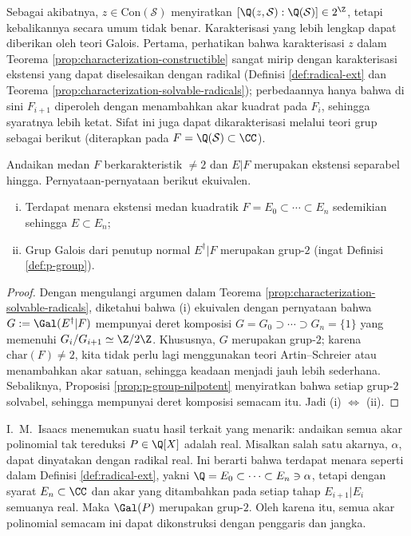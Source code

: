 Sebagai akibatnya, $z \in \text{Con}(\mathcal{S})$ menyiratkan $[\Q(z, \mathcal{S}) : \Q(\mathcal{S})] \in 2^{\Z}$, tetapi kebalikannya secara umum tidak benar. Karakterisasi yang lebih lengkap dapat diberikan oleh teori Galois. Pertama, perhatikan bahwa karakterisasi $z$ dalam Teorema \ref{prop:characterization-constructible} sangat mirip dengan karakterisasi ekstensi yang dapat diselesaikan dengan radikal (Definisi \ref{def:radical-ext} dan Teorema \ref{prop:characterization-solvable-radicals}); perbedaannya hanya bahwa di sini $F_{i+1}$ diperoleh dengan menambahkan akar kuadrat pada $F_i$, sehingga syaratnya lebih ketat. Sifat ini juga dapat dikarakterisasi melalui teori grup sebagai berikut (diterapkan pada $F = \Q(\mathcal{S}) \subset \CC$).
\begin{theorem}\label{prop:characterization-constructible-2}
	Andaikan medan $F$ berkarakteristik $\neq 2$ dan $E|F$ merupakan ekstensi separabel hingga. Pernyataan-pernyataan berikut ekuivalen.
	\begin{enumerate}[(i)]
		\item Terdapat menara ekstensi medan kuadratik $F = E_0 \subset \cdots \subset E_n$ sedemikian sehingga $E \subset E_n$;
		\item Grup Galois dari penutup normal $E^\dagger|F$ merupakan grup-$2$ (ingat Definisi \ref{def:p-group}).
	\end{enumerate}
\end{theorem}
\begin{proof}
	Dengan mengulangi argumen dalam Teorema \ref{prop:characterization-solvable-radicals}, diketahui bahwa (i) ekuivalen dengan pernyataan bahwa $G := \Gal(E^\dagger|F)$ mempunyai deret komposisi $G = G_0 \supset \cdots \supset G_n = \{1\}$ yang memenuhi $G_i/G_{i+1} \simeq \Z/2\Z$. Khususnya, $G$ merupakan grup-$2$; karena $\text{char}(F) \neq 2$, kita tidak perlu lagi menggunakan teori Artin--Schreier atau menambahkan akar satuan, sehingga keadaan menjadi jauh lebih sederhana. Sebaliknya, Proposisi \ref{prop:p-group-nilpotent} menyiratkan bahwa setiap grup-$2$ solvabel, sehingga mempunyai deret komposisi semacam itu. Jadi (i) $\iff$ (ii).
\end{proof}

I.\ M.\ Isaacs \cite{Is85} menemukan suatu hasil terkait yang menarik: andaikan semua akar polinomial tak tereduksi $P \in \Q[X]$ adalah real. Misalkan salah satu akarnya, $\alpha$, dapat dinyatakan dengan radikal real. Ini berarti bahwa terdapat menara seperti dalam Definisi \ref{def:radical-ext}, yakni $\Q = E_0 \subset \cdots \subset E_n \ni \alpha$, tetapi dengan syarat $E_n \subset \CC$ dan akar yang ditambahkan pada setiap tahap $E_{i+1}|E_i$ semuanya real. Maka $\Gal(P)$ merupakan grup-$2$. Oleh karena itu, semua akar polinomial semacam ini dapat dikonstruksi dengan penggaris dan jangka.

